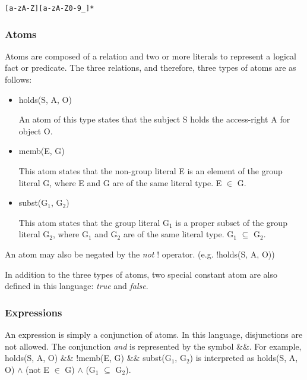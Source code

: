 \documentclass[a4paper,draft]{article}
\begin{document}
\begin{verbatim}
[a-zA-Z][a-zA-Z0-9_]*
\end{verbatim}

      \subsubsection{Atoms}

        Atoms are composed of a relation and two or more literals to represent
        a logical fact or predicate. The three relations, and therefore, three
        types of atoms are as follows:

        \begin{itemize}

          \item holds(S, A, O)

            An atom of this type states that the subject S holds the
            access-right A for object O.

          \item memb(E, G)

          This atom states that the non-group literal E is an element of the
          group literal G, where E and G are of the same literal type.
          E $\in$ G.

          \item subst(G$_{1}$, G$_{2}$)

          This atom states that the group literal G$_{1}$ is a proper
          subset of the group literal G$_{2}$, where G$_{1}$ and G$_{2}$
          are of the same literal type. G$_{1}$ $\subseteq$ G$_{2}$.

        \end{itemize}

        An atom may also be negated by the \emph{not} ! operator. (e.g.
        !holds(S, A, O))

        In addition to the three types of atoms, two special constant atom are
        also defined in this language: \emph{true} and \emph{false}.

      \subsubsection{Expressions}

        An expression is simply a conjunction of atoms. In this language,
        disjunctions are not allowed. The conjunction \emph{and} is 
        represented by the symbol \&\&. For example, holds(S, A, O) \&\& 
        !memb(E, G) \&\& subst(G$_{1}$, G$_{2}$) is interpreted as
        holds(S, A, O) $\land$ (not E $\in$ G) $\land$ (G$_{1}$
        $\subseteq$ G$_{2}$).
\end{document}
